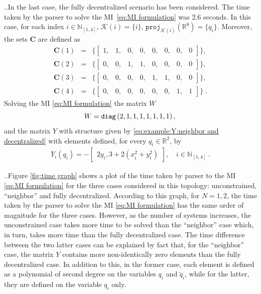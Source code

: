 \documentclass[10pt,twocolumn,twoside]{IEEEtran}
\newcounter{para}
\newcommand\mypara{\par \thesection.\refstepcounter{para}\thepara.\space}
\theoremstyle{plain}
\theoremstyle{definition}
\theoremstyle{remark}
\begin{document}
\mypara In the last case, the fully decentralized scenario has been considered. The time taken by the parser to solve the MI~\eqref{eq:MI formulation} was 2.6 seconds. In this case, for each index $i\in\mathbb{N}_{[1,4]}$, $\mathscr{K}(i)=\{i\}$, $\mathbin{\mathtt{proj}}_{\mathscr{K}(i)}(\mathbb{R}^8)=\{q_i\}$. Moreover, the sets $\mathbf{C}$ are defined as
\begin{equation*}
	\begin{array}{rcl}
		\mathbf{C}(1)&=&\{\begin{bmatrix}
		1,&1,&0,&0,&0,&0,&0,&0\end{bmatrix}\},\\
		\mathbf{C}(2)&=&\{\begin{bmatrix}
		0,&0,&1,&1,&0,&0,&0,&0\end{bmatrix}\},\\
		\mathbf{C}(3)&=&\{\begin{bmatrix}
		0,&0,&0,&0,&1,&1,&0,&0\end{bmatrix}\},\\
		\mathbf{C}(4)&=&\{\begin{bmatrix}
		0,&0,&0,&0,&0,&0,&1,&1\end{bmatrix}\}\;.
	\end{array} 
\end{equation*}
Solving the MI \eqref{eq:MI formulation} the matrix $W$ 
\begin{equation*}
 W=\mathbin{\mathtt{diag}}\left(2,1,1,1,1,1,1,1\right),\\
\end{equation*}
and the matrix $Y$ with structure given by \eqref{eq:example:Y:neighbor and decentralized} with elements defined, for every $q_i\in\mathbb{R}^2$, by 
\begin{align*}
 \overline{Y}_i(q_i)=-\begin{bmatrix}2y_i,3+2(x_i^2+y_i^2)\end{bmatrix},\quad i\in\mathbb{N}_{[1,4]}\;.
\end{align*}

\mypara Figure \ref{fig:time graph} shows a plot of the time taken by parser to the MI \eqref{eq:MI formulation} for the three cases considered in this topology: unconstrained, ``neighbor'' and fully decentralized.  According to this graph, for $N=1,2$, the time taken by the parser to solve the MI \eqref{eq:MI formulation} has the same order of magnitude for the three cases. However, as the number of systems increases, the unconstrained case takes more time to be solved than the ``neighbor'' case which, in turn, takes more time than the fully decentralized case. The time difference between the two latter cases can be explained by fact that, for the ``neighbor'' case, the matrix $Y$ contains more non-identically zero elements than the fully decentralized case. In addition to this, in the former case, each element is defined as a polynomial of second degree on the variables $q_i$ and $\breve{q}_i$, while for the latter, they are defined on the variable $q_i$ only.
\end{document}
